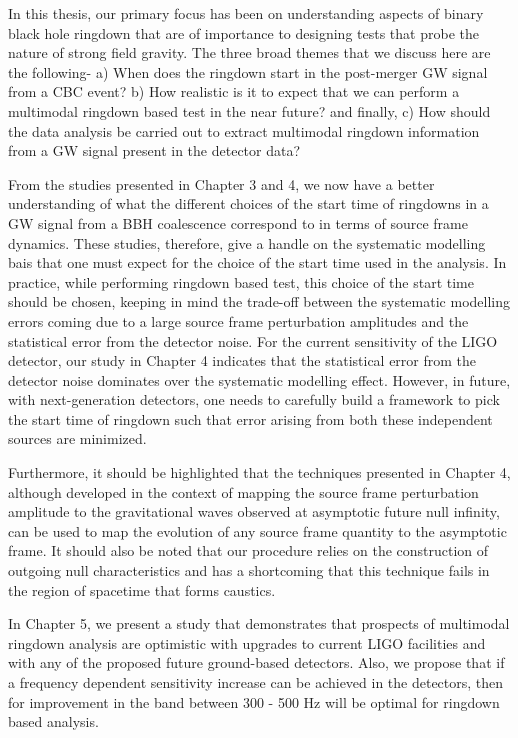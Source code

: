 In this thesis, our primary focus has been on understanding aspects of binary black hole ringdown that are of importance to designing tests that probe the nature of strong field gravity.  The three broad themes that we discuss here are the following- a) When does the ringdown start in the post-merger GW signal from a CBC event?  b) How realistic is it to expect that we can perform a multimodal ringdown based test in the near future? and finally, c) How should the data analysis be carried out to extract multimodal ringdown information from a GW signal present in the detector data?

From the studies presented in  Chapter 3 and 4, we now have a better understanding of what the different choices of the start time of ringdowns in a GW signal from a BBH coalescence correspond to in terms of source frame dynamics. These studies, therefore, give a handle on the systematic modelling bais that one must expect for the choice of the start time used in the analysis. In practice, while performing ringdown based test, this choice of the start time should be chosen, keeping in mind the trade-off between the systematic modelling errors coming due to a large source frame perturbation amplitudes and the statistical error from the detector noise. For the current sensitivity of the LIGO detector, our study in Chapter 4 indicates that the statistical error from the detector noise dominates over the systematic modelling effect. However, in future, with next-generation detectors, one needs to carefully build a framework to pick the start time of ringdown such that error arising from both these independent sources are minimized.  

Furthermore, it should be highlighted that the techniques presented in Chapter 4, although developed in the context of mapping the source frame perturbation amplitude to the gravitational waves observed at asymptotic future null infinity,  can be used to map the evolution of any source frame quantity to the asymptotic frame. It should also be noted that our procedure relies on the construction of outgoing null characteristics and has a shortcoming that this technique fails in the region of spacetime that forms caustics.  

In Chapter 5, we present a study that demonstrates that prospects of multimodal ringdown analysis are optimistic with upgrades to current LIGO facilities and with any of the proposed future ground-based detectors. Also, we propose that if a frequency dependent sensitivity increase can be achieved in the detectors, then for improvement in the band between 300 - 500 Hz will be optimal for ringdown based analysis.  

